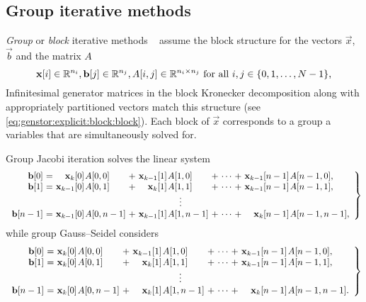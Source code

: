 \subsection{Group iterative methods}
\label{sec:algorithms:group-jgs}

\emph{Group} or \emph{block} iterative methods%
~\citet[Section~10.4]{stewart2009probability} assume the block
structure for the vectors $\vec{x}$, $\vec{b}$ and the matrix $A$
\begin{equation}
  \bm{\mathrm{x}}[i] \in \mathbb{R}^{n_i}, \bm{\mathrm{b}}[j] \in \mathbb{R}^{n_j}, A[i, j] \in
  \mathbb{R}^{n_i \times n_j} \text{ for all $i, j \in \{0, 1, \ldots,
    N - 1\}$,}
\end{equation}
Infinitesimal generator matrices in the block Kronecker decomposition
along with appropriately partitioned vectors match this structure (see
\vref{eq:genstor:explicit:block:block}). Each block of $\vec{x}$
corresponds to a group a variables that are simultaneously solved for.

Group Jacobi iteration solves the linear system
{\small\begin{equation}
    \left.
      \begin{array}{r@{${} = {}$}*{2}{r@{\kern1pt}l@{${} + {}$}}c@{${} + {}$}r@{\kern1pt}l}
        \vec{b}[0] & \vec{x}_{k}[0] & A[0,0] & \vec{x}_{k - 1}[1] & A[1,0] & \cdots & \vec{x}_{k - 1}[n - 1] & A[n - 1,0] \text,\\
        \vec{b}[1] & \vec{x}_{k - 1}[0] & A[0,1] & \vec{x}_{k}[1] & A[1,1] & \cdots & \vec{x}_{k - 1}[n - 1] & A[n - 1,1] \text,\\
        \multicolumn{8}{c}{$\vdots$} \\
        \vec{b}[n - 1] & \vec{x}_{k - 1}[0] & A[0,n - 1] & \vec{x}_{k - 1}[1] & A[1,n - 1] & \cdots & \vec{x}_{k}[n - 1] & A[n - 1,n - 1] \text,\\
      \end{array}
    \right\}
  \end{equation}}%
while group Gauss--Seidel considers
{\small\begin{equation}
    \left.
      \begin{array}{r@{${} = {}$}*{2}{r@{\kern1pt}l@{${} + {}$}}c@{${} + {}$}r@{\kern1pt}l}
        \vec{b}[0] & \vec{x}_{k}[0] & A[0,0] & \vec{x}_{k - 1}[1] & A[1,0] & \cdots & \vec{x}_{k - 1}[n - 1] & A[n - 1,0] \text,\\
        \vec{b}[1] & \vec{x}_{k}[0] & A[0,1] & \vec{x}_{k}[1] & A[1,1] & \cdots & \vec{x}_{k - 1}[n - 1] & A[n - 1,1] \text,\\
        \multicolumn{8}{c}{$\vdots$} \\
        \vec{b}[n - 1] & \vec{x}_{k}[0] & A[0,n - 1] & \vec{x}_{k}[1] & A[1,n - 1] & \cdots & \vec{x}_{k}[n - 1] & A[n - 1,n - 1] \text.\\
      \end{array}
    \right\}
  \end{equation}}

